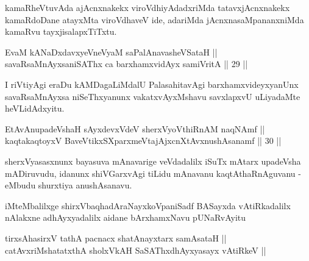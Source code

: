 \begin{artha}
kamaRheVtuvAda ajAcnxnakekx viroVdhiyAdadxriMda tatavxjAcnxnakekx kamaRdoDane atayxMta viroVdhaveV ide, adariMda jAcnxnasaMpananxniMda kamaRvu tayxjisalapxTiTxtu.
\end{artha}

\begin{shl}
EvaM kANaDxdavxyeVneVyaM saPalA\s navasheVSataH || \\
savaRsaMnAyxsaniSAThx ca barxhamxvidAyx samiVritA \hfill || 29 ||  
\end{shl}

\begin{artha}
I riVtiyAgi eraDu kAMDagaLiMdalU PalasahitavAgi barxhamxvideyxyanUnx savaRsaMnAyxsa niSeThxyanunx vakatxvAyxMshavu savxlapxvU uLiyadaMte heVLidAdxyitu.
\end{artha}

\begin{shl}
EtAvAnupadeVshaH sAyxdevxVdeV sherxVyoVthiRnAM naqNAmf || \\
kaqtakaqtoyxV BaveVtikxSXparxmeVtajAjxcnXtAvx\s nushAsanamf \hfill || 30 ||  
\end{shl}

\begin{artha}
sherxVyasasxnunx bayasuva mAnavarige veVdadalilx iSuTx mAtarx upadeVsha mADiruvudu, idanunx shiVGarxvAgi tiLidu mAnavanu kaqtAthaRnAguvanu - eMbudu shurxtiya anushAsanavu.
\end{artha}

\begin{center}
iMteMbalilxge shirxVbaqhadAraNayxkoVpaniSadf BASayxda vAtiRkadalilx nAlakxne adhAyxyadalilx aidane bArxhamxNavu pUNaRvAyitu
\end{center}

\begin{shl}		
tirxsAhasirxV tathA pacnacx shatAnayxtarx samAsataH || \\
catAvxriMshatatxthA sholxVkAH SaSAThxdhAyxyasayx vAtiRkeV ||  
\end{shl}

\begin{center}



\end{center}
